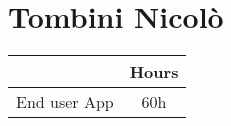 \section{Tombini Nicolò}
\begin{table}[H]
\centering
\begin{tabular}{|l|c|}
\hline
\rowcolor[HTML]{B8C8D5} 
\multicolumn{1}{|c|}{\cellcolor[HTML]{B8C8D5}\textbf{Topic}} & \textbf{Hours} \\ \hline
End user App & 60h \\ \hline
\end{tabular}
\end{table}